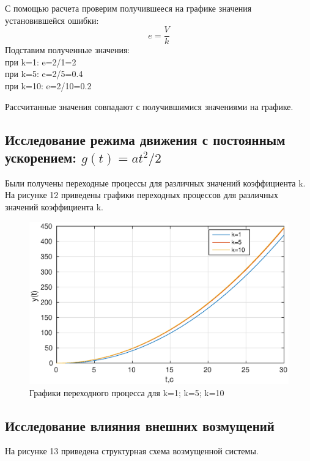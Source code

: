 \documentclass[12pt,a4paper]{article}
\begin{document}
С помощью расчета проверим получившееся на графике значения установившейся ошибки:
\begin{equation}
e=\frac{V}{k}
\end{equation}
Подставим полученные значения:
\\при k=1: e=2/1=2
\\при k=5: e=2/5=0.4
\\при k=10: e=2/10=0.2

Рассчитанные значения совпадают с получившимися значениями на графике.

\subsection{Исследование режима движения с постоянным ускорением: $g(t)=at^2/2$}

Были получены переходные процессы для различных значений коэффициента  k.
\\На рисунке 12 приведены графики переходных процессов  для различных значений коэффициента  k.

\begin{figure}[H]
\centering
\includegraphics[width=\textwidth]{1/2_3y(t).eps}
\caption{Графики переходного процесса для k=1; k=5; k=10}
\end{figure}

\newpage
\begin{center}
\section{Исследование влияния внешних возмущений}
\end{center}
\par На рисунке 13 приведена структурная схема возмущенной системы.
\end{document}
